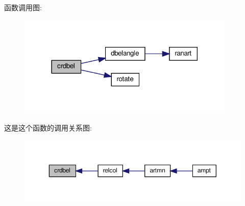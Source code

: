 函数调用图\+:
\nopagebreak
\begin{figure}[H]
\begin{center}
\leavevmode
\includegraphics[width=294pt]{crdbel_8f90_aa2c1d9087666d0c67f0077ad9d4df6f8_cgraph}
\end{center}
\end{figure}
这是这个函数的调用关系图\+:
\nopagebreak
\begin{figure}[H]
\begin{center}
\leavevmode
\includegraphics[width=350pt]{crdbel_8f90_aa2c1d9087666d0c67f0077ad9d4df6f8_icgraph}
\end{center}
\end{figure}
